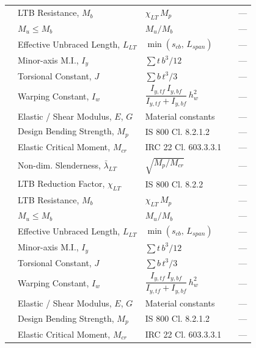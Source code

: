 \documentclass[12pt,a4paper]{report}
\numberwithin{figure}{chapter}
\begin{document}
\begin{longtable}{|C{2.22cm}|L{2.99cm}|L{3.67cm}|C{2.14cm}|C{2.22cm}|}
 & LTB Resistance, $M_b$ & $\chi_{LT}\,M_p$ &  & --- \\*
 & $M_u \leq M_b$ & $M_u / M_b$ &  & --- \\
\hline
{}
 & Effective Unbraced Length, $L_{LT}$ & $\min(s_{cb},\,L_{span})$ &  & --- \\*
 & Minor-axis M.I., $I_y$ & $\sum t\,b^3/12$ &  & --- \\*
 & Torsional Constant, $J$ & $\sum b\,t^3/3$ &  & --- \\*
 & Warping Constant, $I_w$ & $\dfrac{I_{y,tf}\,I_{y,bf}}{I_{y,tf}+I_{y,bf}}\,h_w^2$ &  & --- \\*
 & Elastic / Shear Modulus, $E$, $G$ & Material constants &  & --- \\*
 & Design Bending Strength, $M_p$ & IS 800 Cl. 8.2.1.2 &  & --- \\*
 & Elastic Critical Moment, $M_{cr}$ & IRC 22 Cl. 603.3.3.1 &  & --- \\*
 & Non-dim. Slenderness, $\bar{\lambda}_{LT}$ & $\sqrt{M_p / M_{cr}}$ &  & --- \\
\hline
{}
 & LTB Reduction Factor, $\chi_{LT}$ & IS 800 Cl. 8.2.2 &  & --- \\*
 & LTB Resistance, $M_b$ & $\chi_{LT}\,M_p$ &  & --- \\*
 & $M_u \leq M_b$ & $M_u / M_b$ &  & --- \\
\hline
{}
 & Effective Unbraced Length, $L_{LT}$ & $\min(s_{cb},\,L_{span})$ &  & --- \\*
 & Minor-axis M.I., $I_y$ & $\sum t\,b^3/12$ &  & --- \\*
 & Torsional Constant, $J$ & $\sum b\,t^3/3$ &  & --- \\*
 & Warping Constant, $I_w$ & $\dfrac{I_{y,tf}\,I_{y,bf}}{I_{y,tf}+I_{y,bf}}\,h_w^2$ &  & --- \\*
 & Elastic / Shear Modulus, $E$, $G$ & Material constants &  & --- \\*
 & Design Bending Strength, $M_p$ & IS 800 Cl. 8.2.1.2 &  & --- \\*
 & Elastic Critical Moment, $M_{cr}$ & IRC 22 Cl. 603.3.3.1 &  & --- \\*

\end{longtable}
\end{document}
